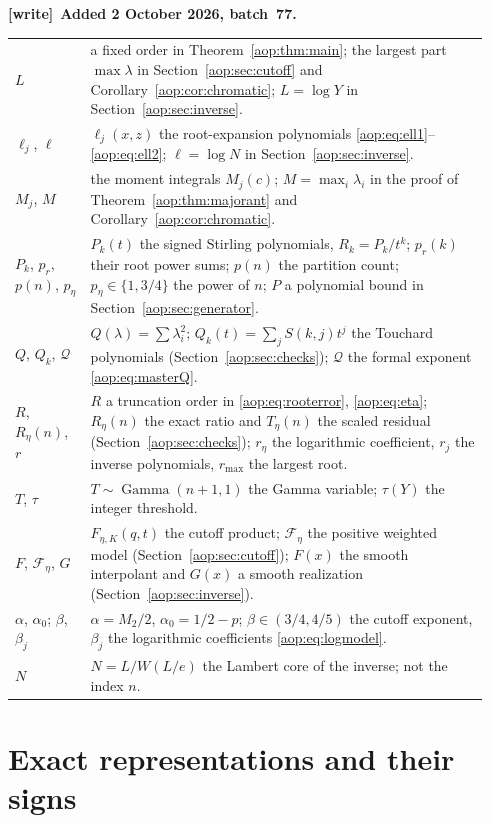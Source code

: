 \documentclass[11pt]{article}
\theoremstyle{remark}\newtheorem{remark}[theorem]{Remark}
\newenvironment{writenote}[1][]{\par\smallskip\begingroup\small
 \noindent\textbf{[write]}\if\relax\detokenize{#1}\relax\else~\textbf{#1.}\fi\ }%
 {\par\endgroup\smallskip}
\begin{document}
\begin{writenote}[Added 2 October 2026, batch~77]
\begin{table}[tbp]
\begin{tabular}{@{}p{0.15\linewidth}p{0.79\linewidth}@{}}
$L$ & a fixed order in Theorem~\ref{aop:thm:main}; the largest part $\max\lambda$ in Section~\ref{aop:sec:cutoff} and Corollary~\ref{aop:cor:chromatic}; $L=\log Y$ in Section~\ref{aop:sec:inverse}.\\
$\ell_j$, $\ell$ & $\ell_j(x,z)$ the root-expansion polynomials \eqref{aop:eq:ell1}--\eqref{aop:eq:ell2}; $\ell=\log N$ in Section~\ref{aop:sec:inverse}.\\
$M_j$, $M$ & the moment integrals $M_j(c)$; $M=\max_i\lambda_i$ in the proof of Theorem~\ref{aop:thm:majorant} and Corollary~\ref{aop:cor:chromatic}.\\
$P_k$, $p_r$, $p(n)$, $p_\eta$ & $P_k(t)$ the signed Stirling polynomials, $R_k=P_k/t^k$; $p_r(k)$ their root power sums; $p(n)$ the partition count; $p_\eta\in\{1,3/4\}$ the power of $n$; $P$ a polynomial bound in Section~\ref{aop:sec:generator}.\\
$Q$, $Q_k$, $\mathcal Q$ & $Q(\lambda)=\sum\lambda_i^2$; $Q_k(t)=\sum_jS(k,j)t^j$ the Touchard polynomials (Section~\ref{aop:sec:checks}); $\mathcal Q$ the formal exponent \eqref{aop:eq:masterQ}.\\
$R$, $R_\eta(n)$, $r$ & $R$ a truncation order in \eqref{aop:eq:rooterror}, \eqref{aop:eq:eta}; $R_\eta(n)$ the exact ratio and $T_\eta(n)$ the scaled residual (Section~\ref{aop:sec:checks}); $r_\eta$ the logarithmic coefficient, $r_j$ the inverse polynomials, $r_{\max}$ the largest root.\\
$T$, $\tau$ & $T\sim\operatorname{Gamma}(n+1,1)$ the Gamma variable; $\tau(Y)$ the integer threshold.\\
$F$, $\mathcal F_\eta$, $G$ & $F_{\eta,K}(q,t)$ the cutoff product; $\mathcal F_\eta$ the positive weighted model (Section~\ref{aop:sec:cutoff}); $F(x)$ the smooth interpolant and $G(x)$ a smooth realization (Section~\ref{aop:sec:inverse}).\\
$\alpha$, $\alpha_0$; $\beta$, $\beta_j$ & $\alpha=M_2/2$, $\alpha_0=1/2-p$; $\beta\in(3/4,4/5)$ the cutoff exponent, $\beta_j$ the logarithmic coefficients \eqref{aop:eq:logmodel}.\\
$N$ & $N=L/W(L/e)$ the Lambert core of the inverse; not the index $n$.\\
\bottomrule
\end{tabular}
\end{table}
\end{writenote}

\section{Exact representations and their signs}\label{aop:sec:exact}
\end{document}
